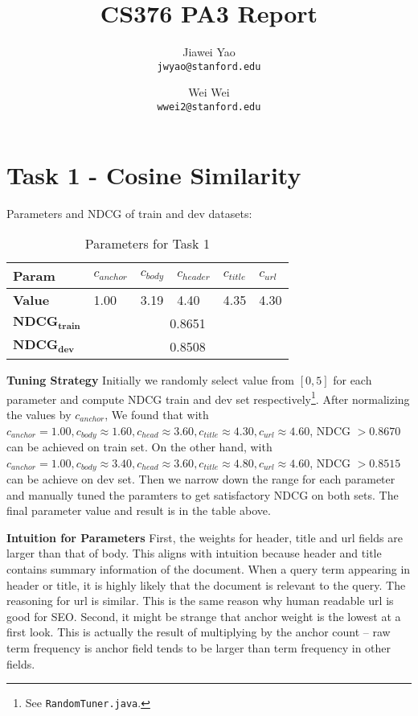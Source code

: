 \documentclass{article}
\begin{document}
\title{CS376 PA3 Report}

\author{
  Jiawei Yao\\
  \texttt{jwyao@stanford.edu}
  \and
  Wei Wei\\
  \texttt{wwei2@stanford.edu}
}

\maketitle

\section{Task 1 - Cosine Similarity}

Parameters and NDCG of train and dev datasets:

\begin{table}[!htb]
    \centering
    \begin{tabular}{ | l | l | l | l | l | l |}
    \hline
    \textbf{Param} & $c_{anchor}$ & $c_{body}$ & $c_{header}$ & $c_{title}$ & $c_{url}$ \\
    \hline
    \textbf{Value} & 1.00 & 3.19 & 4.40 & 4.35 & 4.30 \\
    \hline
    $\mathbf{NDCG_{train}}$ & \multicolumn{5}{c|}{0.8651} \\
    \hline
    $\mathbf{NDCG_{dev}}$ & \multicolumn{5}{c|}{0.8508} \\
    \hline
    \end{tabular}
    \caption{Parameters for Task 1}
\end{table}

\textbf{Tuning Strategy} Initially we randomly select value from $[0,5]$ for each parameter and compute NDCG train and dev set respectively\footnote{See \texttt{RandomTuner.java}.}. After normalizing the values by $c_{anchor}$, We found that with $c_{anchor}= 1.00, c_{body}\approx 1.60, c_{head}\approx 3.60, c_{title}\approx4.30, c_{url}\approx4.60$, NDCG $> 0.8670$ can be achieved on train set. On the other hand, with $c_{anchor}= 1.00, c_{body}\approx 3.40, c_{head}\approx 3.60, c_{title}\approx4.80, c_{url}\approx4.60$, NDCG $> 0.8515$ can be achieve on dev set. Then we narrow down the range for each parameter and manually tuned the paramters to get satisfactory NDCG on both sets. The final parameter value and result is in the table above.

\textbf{Intuition for Parameters} First, the weights for header, title and url fields are larger than that of body. This aligns with intuition because header and title contains summary information of the document. When a query term appearing in header or title, it is highly likely that the document is relevant to the query. The reasoning for url is similar. This is the same reason why human readable url is good for SEO. Second, it might be strange that anchor weight is the lowest at a first look. This is actually the result of multiplying by the anchor count -- raw term frequency is anchor field tends to be larger than term frequency in other fields.
\end{document}
